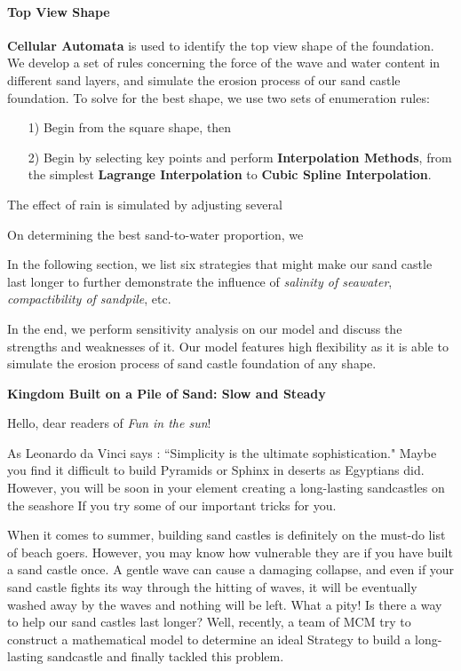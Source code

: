 \documentclass[12pt]{article}
\begin{document}
\paragraph{Top View Shape}\textbf{Cellular Automata} is used to identify the top view shape of the foundation. We develop a set of rules concerning the force of the wave and water content in different sand layers, and simulate the erosion process of our sand castle foundation. To solve for the best shape, we use two sets of enumeration rules:
\begin{itemize}
	\item [1)]
	Begin from the square shape, then
	\item [2)]
	Begin by selecting key points and perform \textbf{Interpolation Methods}, from the simplest \textbf{Lagrange Interpolation} to \textbf{Cubic Spline Interpolation}.
\end{itemize}
\par 
The effect of rain is simulated by adjusting several 
\par 
On determining the best sand-to-water proportion, we 
\par 
In the following section, we list six strategies that might make our sand castle last longer to further demonstrate the influence of \textit{salinity of seawater}, \textit{compactibility of sandpile}, etc. 
\par 
In the end, we perform sensitivity analysis on our model and discuss the strengths and weaknesses of it. Our model features high flexibility as it is able to simulate the erosion process of sand castle foundation of any shape. 

 \clearpage
\pagestyle{fancy}


\begin{center}
    \Large \textbf{Kingdom Built on a Pile of Sand: Slow and Steady}
\end{center}
Hello, dear readers of \textit{Fun in the sun}! 
\par
As Leonardo da Vinci says : “Simplicity is the ultimate sophistication." Maybe you find it difficult to build Pyramids or Sphinx in deserts as Egyptians did. However, you will be soon in your element creating a long-lasting sandcastles on the seashore If you try some of our important tricks for you.
\par
When it comes to summer, building sand castles is definitely on the must-do list of beach goers. However, you may know how vulnerable they are if you have built a sand castle once. A gentle wave can cause a damaging collapse, and even if your sand castle fights its way through the hitting of waves, it will be eventually washed away by the waves and nothing will be left. What a pity! Is there a way to help our sand castles last longer? Well, recently, a team of MCM try to construct a mathematical model to determine an ideal Strategy to build a long-lasting sandcastle and finally tackled this problem.
\end{document}
